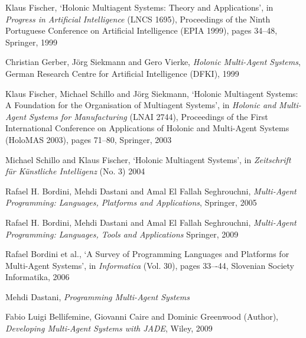 \begin{thebibliography}{99}

Klaus Fischer,
`Holonic Multiagent Systems: Theory and Applications',
in \textit{Progress in Artificial Intelligence} (LNCS 1695),
Proceedings of the Ninth Portuguese Conference on Artificial Intelligence (EPIA 1999),
pages 34--48,
Springer, 1999

Christian Gerber, J\"{o}rg Siekmann and Gero Vierke,
\textit{Holonic Multi-Agent Systems},
German Research Centre for Artificial Intelligence (DFKI), 1999

Klaus Fischer, Michael Schillo and J\"{o}rg Siekmann,
`Holonic Multiagent Systems: A Foundation for the Organisation of Multiagent Systems',
in \textit{Holonic and Multi-Agent Systems for Manufacturing} (LNAI 2744),
Proceedings of the First International Conference on Applications of Holonic and Multi-Agent Systems (HoloMAS 2003),
pages 71--80,
Springer, 2003

Michael Schillo and Klaus Fischer,
`Holonic Multiagent Systems',
in \textit{Zeitschrift für Künstliche Intelligenz} (No. 3)
2004


Rafael H. Bordini, Mehdi Dastani and Amal El Fallah Seghrouchni,
\textit{Multi-Agent Programming: Languages, Platforms and Applications},
Springer, 2005

Rafael H. Bordini, Mehdi Dastani and Amal El Fallah Seghrouchni,
\textit{Multi-Agent Programming: Languages, Tools and Applications}
Springer, 2009

Rafael Bordini et al.,
`A Survey of Programming Languages and Platforms for Multi-Agent Systems',
in \textit{Informatica} (Vol. 30),
pages 33–-44,
Slovenian Society Informatika, 2006

Mehdi Dastani,
\textit{Programming Multi-Agent Systems}


Fabio Luigi Bellifemine, Giovanni Caire and Dominic Greenwood (Author),
\textit{Developing Multi-Agent Systems with JADE},
Wiley, 2009


\end{thebibliography}
